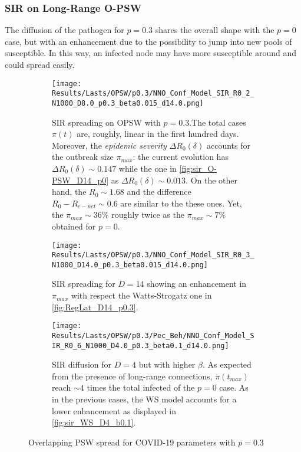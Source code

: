 \documentclass[a4paper,10pt, oneside]{book} %
\theoremstyle{definition}
\begin{document}
\subsubsection*{SIR on Long-Range O-PSW}
The diffusion of the pathogen for $p = 0.3$ shares the overall shape with the $p = 0$ case, but with an enhancement due to the possibility to jump into new pools of susceptible. In this way, an infected node may have more susceptible around and could spread easily.

\begin{figure}[H]
	\centering
	\begin{subfigure}[t]{\linewidth}
		\centering
		\texttt{[image: Results/Lasts/OPSW/p0.3/NNO\_Conf\_Model\_SIR\_R0\_2\_N1000\_D8.0\_p0.3\_beta0.015\_d14.0.png]}
		\caption{SIR spreading on OPSW with $ p = 0.3$.The total cases $ \pi(t)$ are, roughly, linear in the first hundred days. Moreover, the \textit{epidemic severity} $ \Delta R_0(\delta)$  accounts for the outbreak size $ \pi_{max}$: the current evolution has $\Delta R_0(\delta) \sim 0.147$ while the one in \autoref{fig:sir_O-PSW_D14_p0} as $ \Delta R_0(\delta) \sim 0.013$. On the other hand, the $R_0 \sim 1.68$ and the difference $R_0 - R_{c-net} \sim 0.6$ are similar to the these ones. Yet, the $\pi_{max} \sim 36\%$ roughly twice as the $\pi_{max} \sim 7\%$ obtained for $ p = 0$.}
		\label{fig:sir_O-PSW_D8_p0.3}
	\end{subfigure}
	\begin{subfigure}[t]{\linewidth}
		\centering
		\texttt{[image: Results/Lasts/OPSW/p0.3/NNO\_Conf\_Model\_SIR\_R0\_3\_N1000\_D14.0\_p0.3\_beta0.015\_d14.0.png]}
		\caption{SIR spreading for $ D = 14$ showing an enhancement in $ \pi_{max} $ with respect the Watts-Strogatz one in \autoref{fig:RegLat_D14_p0.3}.}
		\label{fig:sir_O-PSW_D14_p0.3}
	\end{subfigure}
	\begin{subfigure}[t]{\linewidth}
		\centering
		\texttt{[image: Results/Lasts/OPSW/p0.3/Pec\_Beh/NNO\_Conf\_Model\_SIR\_R0\_6\_N1000\_D4.0\_p0.3\_beta0.1\_d14.0.png]}
		\caption{SIR diffusion for $ D = 4$ but with higher $\beta$. As expected from the presence of long-range connections, $\pi(t_{max})$ reach $\sim 4$ times the total infected of the $ p=0$ case. As in the previous cases, the WS model accounts for a lower enhancement as displayed in \autoref{fig:sir_WS_D4_b0.1}.}
		\label{fig:sir_O-PSW_D8_b0.1}
	\end{subfigure}
	\caption{Overlapping PSW spread for COVID-19 parameters with $p = 0.3$ }
\end{figure}
\end{document}
